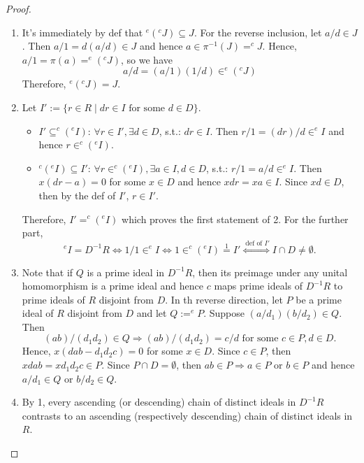 \begin{proof}
    \begin{enumerate}
        \item It's immediately by def that $^e(^cJ)\subseteq J$. For the reverse inclusion, let $a/d \in J$. Then $a/1= d(a/d) \in J$ and hence $a\in \pi^{-1}(J)= ^cJ$. Hence, $a/1=\pi(a)= ^e(^cJ)$, so we have
        $$a/d= (a/1)(1/d) \in ^e(^cJ)$$
        Therefore, $^e(^cJ) =J$.

        \item Let $I':= \{r\in R\mid dr\in I \text{ for some } d\in D\}$.
        \begin{itemize}
            \item $I'\subseteq ^c(^eI)$: $\forall r\in I', \exists d\in D$, s.t.: $dr\in I$. Then $r/1=(dr)/d \in ^eI$ and hence $r\in ^c(^eI)$.
            \item $^c(^eI) \subseteq I'$: $\forall r\in ^c(^eI), \exists a\in I,d\in D$, s.t.: $r/1=a/d \in ^eI$. Then $x(dr-a) =0$ for some $x\in D$ and hence $xdr=xa \in I$. Since $xd\in D$, then by the def of $I'$, $r\in I'$.
        \end{itemize}
        Therefore, $I'=^c(^eI)$ which proves the first statement of 2. For the further part,
        \[
        ^eI=D^{-1}R \Leftrightarrow 1/1\in ^eI \Leftrightarrow 1\in ^c(^eI) \overset{1}{=} I' \overset{\text{ def of }I'}{\Longleftrightarrow} I \cap D\neq \emptyset.
        \]

        \item Note that if $Q$ is a prime ideal in $D^{-1}R$, then its preimage under any unital homomorphism is a prime ideal and hence $c$ maps prime ideals of $D^{-1}R$ to prime ideals of $R$ disjoint from $D$. In th reverse direction, let $P$ be a prime ideal of $R$ disjoint from $D$ and let $Q:= ^eP$. Suppose $(a/d_1) (b/d_2) \in Q$. Then
        \[
        (ab)/(d_1d_2) \in Q \Rightarrow (ab)/(d_1d_2)=c/d \text{ for some } c\in P,d\in D.
        \]
        Hence, $x(dab-d_1d_2c)=0$ for some $x\in D$. Since $c\in P$, then $xdab=xd_1d_2c \in P$. Since $P \cap D=\emptyset$, then $ab\in P \Rightarrow a\in P$ or $b\in P$ and hence $a/d_1\in Q$ or $b/d_2\in Q$.

        \item By 1, every ascending (or descending) chain of distinct ideals in $D^{-1}R$ contrasts to an ascending (respectively descending) chain of distinct ideals in $R$.
    \end{enumerate}
\end{proof}

